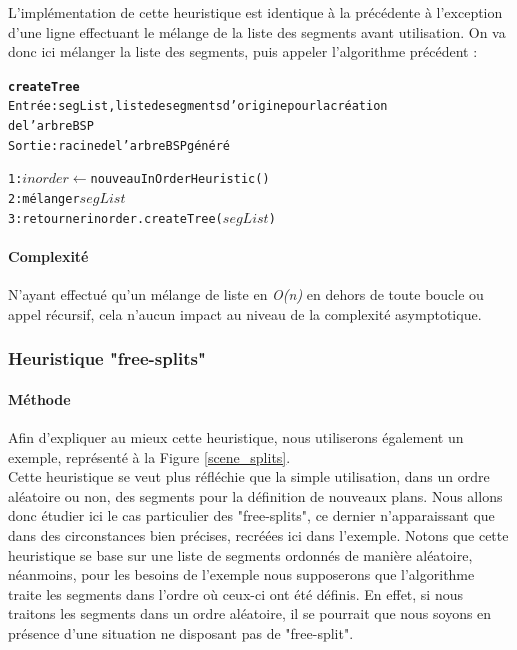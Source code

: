 \documentclass[11pt,a4paper]{article}
\begin{document}
L'implémentation de cette heuristique est identique à la précédente à l'exception d'une ligne effectuant le mélange de la liste des segments avant utilisation. On va donc ici mélanger la liste des segments, puis appeler l'algorithme précédent :

\begin{alltt}
\textbf{createTree}
Entrée : segList, liste de segments d'origine pour la création 
de l'arbre BSP
Sortie : racine de l'arbre BSP généré

1: \(inorder \leftarrow\) nouveau InOrderHeuristic()
2: mélanger \(segList\)
3: retourner inorder.createTree(\(segList\))
\end{alltt}

\paragraph{Complexité}

N'ayant effectué qu'un mélange de liste en \emph{O(n)} en dehors de toute boucle ou appel récursif, cela n'aucun impact au niveau de la complexité asymptotique. 

\subsubsection{Heuristique "free-splits"}

\paragraph{Méthode}

Afin d'expliquer au mieux cette heuristique, nous utiliserons également un exemple, représenté à la Figure \ref{scene_splits}. \\

Cette heuristique se veut plus réfléchie que la simple utilisation, dans un ordre aléatoire ou non, des segments pour la définition de nouveaux plans. Nous allons donc étudier ici le cas particulier des "free-splits", ce dernier n'apparaissant que dans des circonstances bien précises, recréées ici dans l'exemple. Notons que cette heuristique se base sur une liste de segments ordonnés de manière aléatoire, néanmoins, pour les besoins de l'exemple nous supposerons que l'algorithme traite les segments dans l'ordre où ceux-ci ont été définis. En effet, si nous traitons les segments dans un ordre aléatoire, il se pourrait que nous soyons en présence d'une situation ne disposant pas de "free-split".
\end{document}
